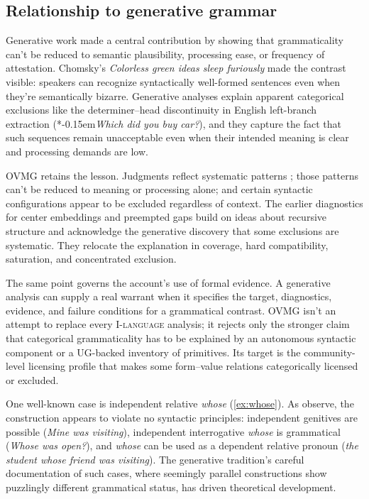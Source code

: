 \documentclass[12pt,letterpaper]{article}
\newcommand{\term}[1]{\textsc{#1}}
\newcommand{\mention}[1]{\textit{#1}}
\newcommand{\judgesep}{\kern-0.15em}
\newcommand{\ungram}[1]{*\judgesep#1}
\begin{document}
\subsection{Relationship to generative grammar}

Generative work made a central contribution by showing that grammaticality
can't be reduced to semantic plausibility, processing ease, or frequency of
attestation. Chomsky's \mention{Colorless green ideas sleep furiously} made
the contrast visible: speakers can recognize syntactically well-formed
sentences even when they're semantically bizarre. Generative analyses explain
apparent categorical exclusions like the determiner--head discontinuity in
English left-branch extraction (\ungram{\mention{Which did you buy car?}}), and
they capture the fact that such sequences remain unacceptable
even when their intended meaning is clear and processing demands are low.

OVMG retains the lesson. Judgments reflect systematic patterns
\autocite{dennett1991}; those patterns can't be reduced to meaning or processing
alone; and certain syntactic configurations appear to be excluded regardless of
context. The earlier diagnostics for center embeddings and preempted gaps build
on ideas about recursive structure and acknowledge the generative discovery that
some exclusions are systematic. They relocate the explanation in coverage, hard
compatibility, saturation, and concentrated exclusion.

The same point governs the account's use of formal evidence. A
generative analysis can supply a real warrant when it specifies the target,
diagnostics, evidence, and failure conditions for a grammatical contrast. OVMG
isn't an attempt to replace every \term{I-language} analysis; it rejects only the
stronger claim that categorical grammaticality has to be explained by an autonomous
syntactic component or a UG-backed inventory of primitives. Its target is the
community-level licensing profile that makes some form--value relations
categorically licensed or excluded.

One well-known case is independent relative \mention{whose} (\ref{ex:whose}). As
\textcite{hankamer1973whose} observe, the construction appears to violate no
syntactic principles: independent genitives are possible (\mention{Mine was
visiting}), independent interrogative \mention{whose} is grammatical
(\mention{Whose was open?}), and \mention{whose} can be used as a dependent
relative pronoun (\mention{the student whose friend was visiting}). The
generative tradition's careful documentation of such cases, where seemingly
parallel constructions show puzzlingly different grammatical status, has driven
theoretical development.
\end{document}
